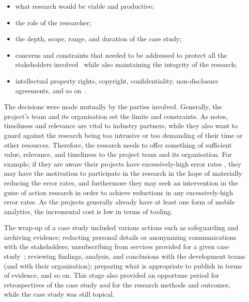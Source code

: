 \begin{itemize}
\item what research would be viable and productive; 
\item the role of the researcher; 
\item the depth, scope, range, and duration of the case study; 
\item concerns and constraints that needed to be addressed to protect all the stakeholders involved~ while also maintaining the integrity of the research;
\item intellectual property rights, copyright, confidentiality, non-disclosure agreements, and so on~.
\end{itemize}

The decisions were made mutually by the parties involved. Generally, the project's team and its organisation set the limits and constraints. As  notes, timeliness and relevance are vital to industry partners, while they also want to guard against the research being too intrusive or too demanding of their time or other resources. Therefore, the research needs to offer something of sufficient value, relevance, and timeliness to the project team and its organisation. For example, if they are aware their projects have excessively-high error rates %
, they may have the motivation to participate in the research in the hope of materially reducing the error rates, and furthermore they may seek an intervention in the guise of action research in order to achieve reductions in any excessively-high error rates.  As the projects generally already have at least one form of mobile analytics, the incremental cost is low in terms of tooling.


The wrap-up of a case study included various actions such as safeguarding and archiving evidence; redacting personal details or anonymizing communications with the stakeholders; unsubscribing from services provided for a given case study~; reviewing findings, analysis, and conclusions with the development teams (and with their organisation); preparing what is appropriate to publish in terms of evidence, and so on. This stage also provided an opportune period for retrospectives of the case study \textit{and} for the research methods and outcomes, while the case study was still topical. 


